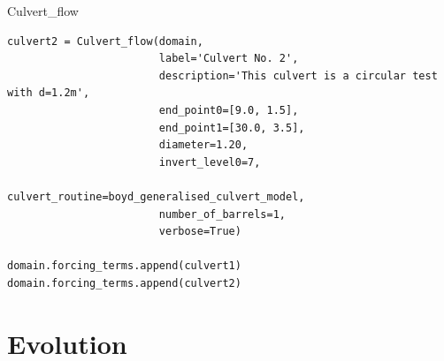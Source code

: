 \documentclass{manual}
\begin{document}
\begin{classdesc}{Culvert_flow}
\begin{verbatim}
culvert2 = Culvert_flow(domain,
                        label='Culvert No. 2',
                        description='This culvert is a circular test with d=1.2m',
                        end_point0=[9.0, 1.5],
                        end_point1=[30.0, 3.5],
                        diameter=1.20,
                        invert_level0=7,
                        culvert_routine=boyd_generalised_culvert_model,
                        number_of_barrels=1,
                        verbose=True)

domain.forcing_terms.append(culvert1)
domain.forcing_terms.append(culvert2)
\end{verbatim}
\end{classdesc}


\section{Evolution}
\label{sec:evolution}
\end{document}

